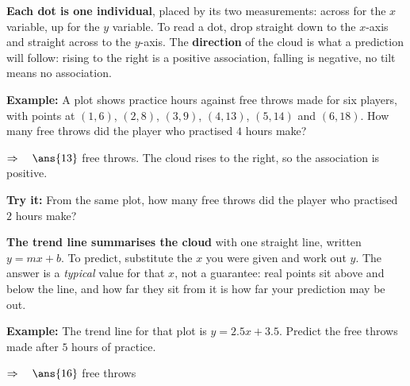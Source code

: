 \documentclass[12pt]{article}
\begin{document}


\begin{formulabox}
\textbf{Each dot is one individual}, placed by its two measurements: across for the $x$ variable,
up for the $y$ variable. To read a dot, drop straight down to the $x$-axis and straight across to
the $y$-axis. The \textbf{direction} of the cloud is what a prediction will follow: rising to the
right is a positive association, falling is negative, no tilt means no association.
\end{formulabox}

\begin{examplebox}
\textbf{Example:} \quad A plot shows practice hours against free throws made for six players, with
points at $(1, 6)$, $(2, 8)$, $(3, 9)$, $(4, 13)$, $(5, 14)$ and $(6, 18)$. How many free throws did
the player who practised $4$ hours make?

$\Rightarrow\quad \ans{13}$ free throws. The cloud rises to the right, so the association is positive.
\end{examplebox}

\begin{tryitbox}
\textbf{Try it:} \quad From the same plot, how many free throws did the player who practised $2$
hours make?\\[2pt]
\end{tryitbox}


\begin{formulabox}
\textbf{The trend line summarises the cloud} with one straight line, written $y = mx + b$. To
predict, substitute the $x$ you were given and work out $y$. The answer is a \emph{typical} value
for that $x$, not a guarantee: real points sit above and below the line, and how far they sit from
it is how far your prediction may be out.
\end{formulabox}

\begin{examplebox}
\textbf{Example:} \quad The trend line for that plot is $y = 2.5x + 3.5$. Predict the free throws
made after $5$ hours of practice.

$\Rightarrow\quad \ans{16}$ free throws
\end{examplebox}
\end{document}
